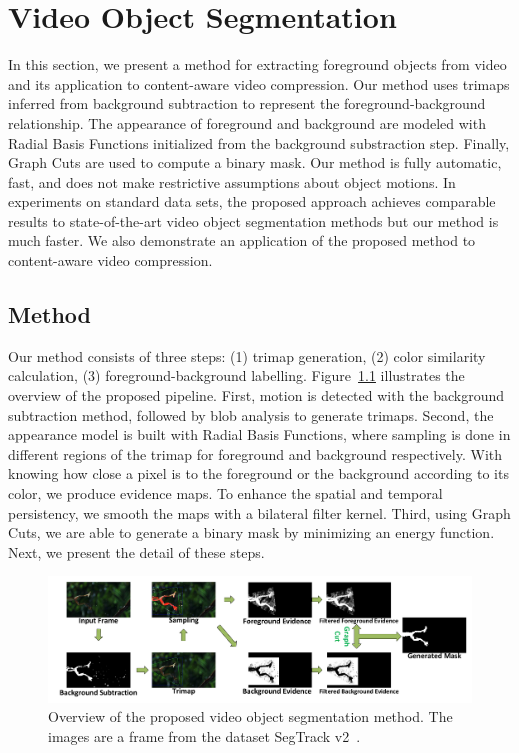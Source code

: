 \chapter{Video Object Segmentation}
\label{chap:vos}

In this section, we present a method for extracting foreground objects from video and its application to content-aware video compression. Our method uses trimaps inferred from background subtraction to represent the foreground-background relationship. The appearance of foreground and background are modeled with Radial Basis Functions initialized from the background substraction step. Finally, Graph Cuts are used to compute a binary mask. Our method is fully automatic, fast, and does not make restrictive assumptions about object motions. In experiments on standard data sets, the proposed approach achieves comparable results to state-of-the-art video object segmentation methods but our method is much faster. We also demonstrate an application of the proposed method to content-aware video compression.

\section{Method}

Our method consists of three steps: (1) trimap generation, (2) color similarity calculation, (3) foreground-background labelling. Figure~\ref{fig-overview} illustrates the overview of the proposed pipeline. First, motion is detected with the background subtraction method, followed by blob analysis to generate trimaps. Second, the appearance model is built with Radial Basis Functions, where sampling is done in different regions of the trimap for foreground and background respectively. With knowing how close a pixel is to the foreground or the background according to its color, we produce evidence maps. To enhance the spatial and temporal persistency, we smooth the maps with a bilateral filter kernel. Third, using Graph Cuts, we are able to generate a binary mask by minimizing an energy function. Next, we present the detail of these steps.

\begin{figure}
	\centering
	\includegraphics[width=\textwidth]{figures/overview.pdf}
	\caption{Overview of the proposed video object segmentation method. The images are a frame from the dataset SegTrack v2~\cite{f-li2013}.}
	\label{fig-overview}
\end{figure}

